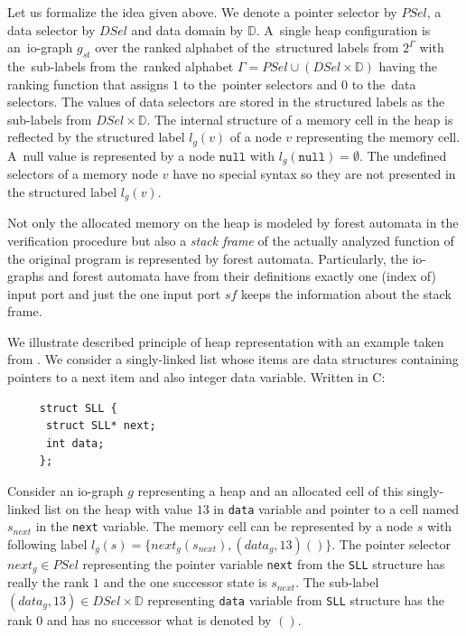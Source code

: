 Let us formalize the idea given above.
We denote a pointer selector by $PSel$, a data selector by $DSel$ and data domain by $\mathbb{D}$.
A~single heap configuration is an~io-graph $g_{st}$ over the ranked alphabet of the~structured labels from $2^\Gamma$
with the~sub-labels from the~ranked alphabet $\Gamma = PSel \cup (DSel \times \mathbb{D})$ having the
ranking function that assigns $1$ to the~pointer selectors and $0$ to the~data selectors.
The values of data selectors are stored in the structured labels as the sub-labels from $DSel \times \mathbb{D}$.
The internal structure of a memory cell in the heap
is reflected by the structured label $l_g(v)$ of a node $v$ representing the memory cell. 
A~null value is represented by a node $\texttt{null}$ with $l_g(\texttt{null}) = \emptyset$.
The undefined selectors of a memory node $v$ have no special syntax so they are
not presented in the structured label $l_g(v)$.

Not only the allocated memory on the heap is modeled by forest automata
in the verification procedure but also a \emph{stack frame} of the actually
analyzed function of the original program is represented by forest automata.
Particularly, the io-graphs and forest automata have from their definitions exactly one (index of) input port and
just the one input port $\mathit{sf}$ keeps the information about the stack frame.


\bexmp
We illustrate described principle of heap representation with an example taken from \cite{techrep}.
We consider a singly-linked list whose items are data structures containing pointers to
a next item and also integer data variable. Written in C:
\begin{center}
\begin{minipage}{0.3\textwidth}
    \begin{verbatim}
     struct SLL {
      struct SLL* next;
      int data;
     };
    \end{verbatim}
\end{minipage}
\end{center}
Consider an io-graph $g$ representing a heap and an allocated cell of this singly-linked list
on the heap with value $13$ in \texttt{data} variable and pointer to a cell named $s_{next}$
in the \texttt{next} variable.
The memory cell can be represented by a node $s$ with following label $l_g(s) = \{next_g(s_{next}),(data_g,13)()\}$.
The pointer selector $next_g \in PSel$ representing the pointer variable \texttt{next} from the \texttt{SLL} structure
has really the rank $1$ and the one successor state is $s_{next}$.
The sub-label $(data_g,13) \in DSel\times \mathbb{D}$ representing
\texttt{data} variable from \texttt{SLL} structure has the rank $0$
and has no successor what is denoted by $()$.
\eexmp

